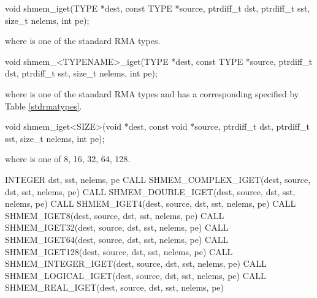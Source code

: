 
\begin{apidefinition}

\begin{C11synopsis}
void shmem_iget(TYPE *dest, const TYPE *source, ptrdiff_t dst, ptrdiff_t sst, size_t nelems, int pe);
\end{C11synopsis}
where \TYPE{} is one of the standard \ac{RMA} types.

\begin{Csynopsis}
void shmem_<TYPENAME>_iget(TYPE *dest, const TYPE *source, ptrdiff_t dst, ptrdiff_t sst, size_t nelems, int pe);
\end{Csynopsis}
where \TYPE{} is one of the standard \ac{RMA} types and has a corresponding \TYPENAME{} specified by Table \ref{stdrmatypes}.

\begin{CsynopsisCol}
void shmem_iget<SIZE>(void *dest, const void *source, ptrdiff_t dst, ptrdiff_t sst, size_t  nelems, int pe);
\end{CsynopsisCol}
where \SIZE{} is one of {8, 16, 32, 64, 128}.


\begin{Fsynopsis}
INTEGER dst, sst, nelems, pe
CALL SHMEM_COMPLEX_IGET(dest, source, dst, sst, nelems, pe)
CALL SHMEM_DOUBLE_IGET(dest, source, dst, sst, nelems, pe)
CALL SHMEM_IGET4(dest, source, dst, sst, nelems, pe)
CALL SHMEM_IGET8(dest, source, dst, sst, nelems, pe)
CALL SHMEM_IGET32(dest, source, dst, sst, nelems, pe)
CALL SHMEM_IGET64(dest, source, dst, sst, nelems, pe)
CALL SHMEM_IGET128(dest, source, dst, sst, nelems, pe)
CALL SHMEM_INTEGER_IGET(dest, source, dst, sst, nelems, pe)
CALL SHMEM_LOGICAL_IGET(dest, source, dst, sst, nelems, pe)
CALL SHMEM_REAL_IGET(dest, source, dst, sst, nelems, pe)
\end{Fsynopsis}


\end{apidefinition}
